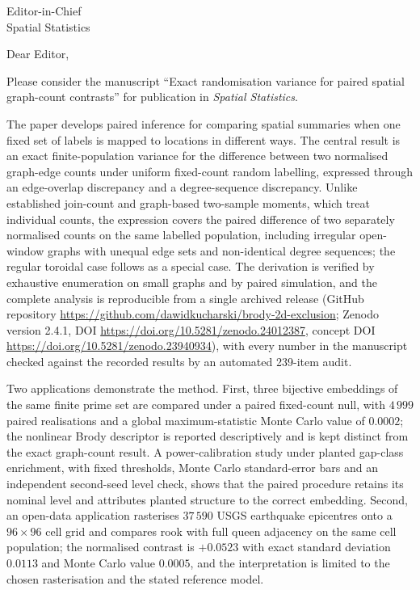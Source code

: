 \documentclass{letter}
\date{\today}
\begin{document}
\begin{letter}{Editor-in-Chief\\
Spatial Statistics}
\opening{Dear Editor,}

Please consider the manuscript ``Exact randomisation variance for paired
spatial graph-count contrasts'' for
publication in \emph{Spatial Statistics}.

The paper develops paired inference for comparing spatial summaries when one
fixed set of labels is mapped to locations in different ways. The central
result is an exact finite-population variance for the difference between two
normalised graph-edge counts under uniform fixed-count random labelling,
expressed through an edge-overlap discrepancy and a degree-sequence
discrepancy. Unlike established join-count and graph-based two-sample
moments, which treat individual counts, the expression covers the paired
difference of two separately normalised counts on the same labelled
population, including irregular open-window graphs with unequal edge sets and
non-identical degree sequences; the regular toroidal case follows as a
special case. The derivation is verified by exhaustive enumeration on small
graphs and by paired simulation, and the complete analysis is reproducible
from a single archived release (GitHub repository
\url{https://github.com/dawidkucharski/brody-2d-exclusion}; Zenodo version
2.4.1, DOI \url{https://doi.org/10.5281/zenodo.24012387}, concept DOI
\url{https://doi.org/10.5281/zenodo.23940934}), with every number in the
manuscript checked against the recorded results by an automated 239-item
audit.

Two applications demonstrate the method. First, three bijective embeddings of
the same finite prime set are compared under a paired fixed-count null, with
$4\,999$ paired realisations and a global maximum-statistic Monte Carlo value
of $0.0002$; the nonlinear Brody descriptor is reported descriptively and is
kept distinct from the exact graph-count result. A power-calibration study
under planted gap-class enrichment, with fixed thresholds, Monte Carlo
standard-error bars and an independent second-seed level check, shows that
the paired procedure retains its nominal level and attributes planted
structure to the correct embedding. Second, an open-data application
rasterises $37\,590$ USGS earthquake epicentres onto a $96\times96$ cell grid
and compares rook with full queen adjacency on the same cell population; the
normalised contrast is $+0.0523$ with exact standard deviation $0.0113$ and
Monte Carlo value $0.0005$, and the interpretation is limited to the chosen
rasterisation and the stated reference model.


\end{letter}
\end{document}
